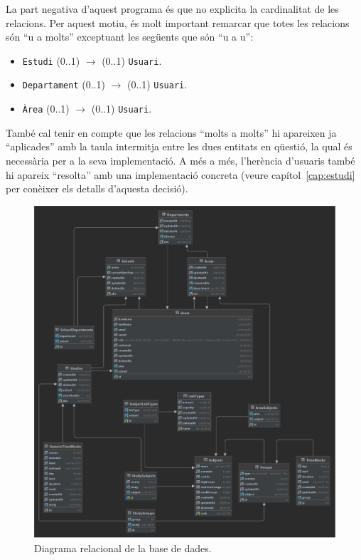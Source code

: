 \documentclass[a4paper,12pt]{ThesisStyle}
\begin{document}
La part negativa d'aquest programa és que no explicita la cardinalitat de les relacions. Per aquest motiu, és molt important remarcar que totes les relacions són ``u a molts'' exceptuant les següents que són ``u a u'':
\begin{itemize}
  \item \texttt{Estudi} (0..1) $\longrightarrow$ (0..1) \texttt{Usuari}.
  \item \texttt{Departament} (0..1) $\longrightarrow$ (0..1) \texttt{Usuari}.
  \item \texttt{Àrea} (0..1) $\longrightarrow$ (0..1) \texttt{Usuari}.
\end{itemize}

També cal tenir en compte que les relacions ``molts a molts'' hi apareixen ja ``aplicades'' amb la taula intermitja entre les dues entitats en qüestió, la qual és necessària per a la seva implementació. A més a més, l'herència d'usuaris també hi apareix ``resolta'' amb una implementació concreta (veure capítol~\ref{cap:estudi} per conèixer els detalls d'aquesta decisió).

\begin{figure}[H]
	\centering
	\includegraphics[width=\textwidth]{assets/db.pdf}
	\caption{\label{img:db}Diagrama relacional de la base de dades.}
\end{figure}
\end{document}
